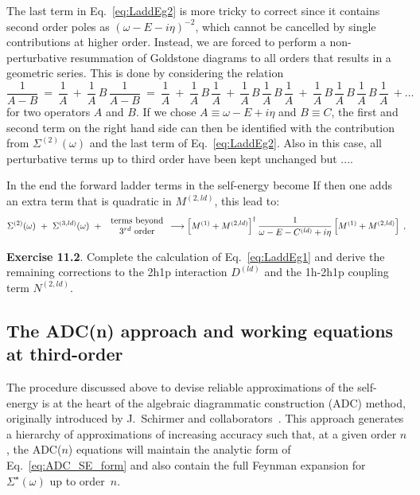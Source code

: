 The last term in Eq.~\eqref{eq:LaddEg2} is more tricky to correct since it contains second order poles as $(\omega  - E - i\eta)^{-2}$, which cannot be 
cancelled by single contributions at higher order. Instead, we are forced to perform a non-perturbative resummation of Goldstone diagrams to all orders that results in a geometric series. This is done by considering the relation
\begin{equation}
 \frac1{A-B}  ~=~  \frac1 A ~+~ \frac1 A  \, B \,  \frac1{A-B}  ~=~  \frac1 A  ~+~  \frac1 A  \, B \,  \frac1 A  ~+~  \frac1 A  \, B \,   \frac1 A   \, B \,   \frac1 A
             ~+~ \frac1 A  \, B \,  \frac1 A  \, B \,  \frac1 A  \, B \,  \frac1 A  ~+ \ldots
  \label{eq:1overAB}
\end{equation}
for two operators $A$ and $B$. If we chose  $A\equiv{\omega  - E + i\eta}$ and $B\equiv C$,  the first and second term on the right hand 
side can then be  identified with the contribution from $\Sigma^{(2)}(\omega)$ and the  last term of Eq.~\eqref{eq:LaddEg2}. 
Also in this case, all perturbative terms up to third order have been kept unchanged  but ....

In the end the forward ladder terms in the self-energy become
If then one adds an extra term that is quadratic in  $M^{(2,ld)}$, this lead to:
\begin{eqnarray}
  \Sigma^{(2)}(\omega)  ~+~ \Sigma^{(3, ld)}(\omega) ~+~ \begin{array}{c} \hbox{terms beyond} \\ \hbox{ 3$^{rd}$ order } \end{array} 
  \nonumber 
 \longrightarrow  \left[ M^{(1)} +  M^{(2,ld)}\right]^\dagger \frac1{\omega  - E - C^{(ld)} + i\eta}\left[ M^{(1)} + M^{(2,ld)}\right]  \; ,
\end{eqnarray}


{\bf Exercise 11.2}.  Complete  the calculation of Eq.~\eqref{eq:LaddEg1} and derive the remaining corrections to the 2h1p interaction $D^{(ld)}$  and the 1h-2h1p coupling term  $N^{(2,ld)}$.


\subsection{The ADC(n) approach and working equations at third-order}

 The  procedure discussed above to devise reliable approximations of the self-energy is at the heart of the
 algebraic diagrammatic construction  (ADC) method, originally introduced by J.~Schirmer and collaborators~\cite{}.
 This approach  generates  a hierarchy of approximations of increasing accuracy such that,
 at a given order $n$, the ADC($n$) equations will maintain the analytic form of Eq.~\eqref{eq:ADC_SE_form} and
 also contain the full Feynman expansion for $\Sigma^\star(\omega)$ up to order~$n$.
 
